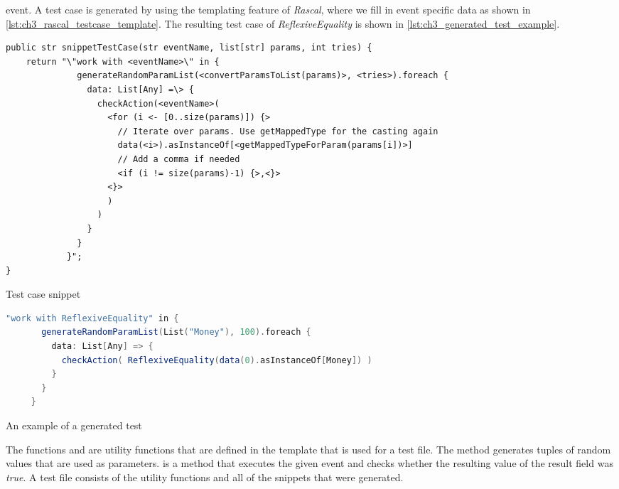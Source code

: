 event. A test case is generated by using the templating feature of
\textit{Rascal}, where we fill in event specific data as shown in
\autoref{lst:ch3_rascal_testcase_template}. The resulting test case of
\textit{ReflexiveEquality} is shown in \autoref{lst:ch3_generated_test_example}.
\begin{sourcecode}[!ht]
\begin{lstlisting}[language=Rascal]
public str snippetTestCase(str eventName, list[str] params, int tries) {
	return "\"work with <eventName>\" in {
	          generateRandomParamList(<convertParamsToList(params)>, <tries>).foreach {
	            data: List[Any] =\> {
	              checkAction(<eventName>(
	       	        <for (i <- [0..size(params)]) {>
                      // Iterate over params. Use getMappedType for the casting again
                      data(<i>).asInstanceOf[<getMappedTypeForParam(params[i])>]
                      // Add a comma if needed
                      <if (i != size(params)-1) {>,<}>
                    <}>
	                )
	              )
	            }
	          }
	        }";
}
\end{lstlisting}
\caption{Test case snippet}
\label{lst:ch3_rascal_testcase_template}
\end{sourcecode}
\FloatBarrier

\begin{sourcecode}[!ht]
\begin{lstlisting}[language=Scala]
    "work with ReflexiveEquality" in {
       generateRandomParamList(List("Money"), 100).foreach {
         data: List[Any] => {
           checkAction( ReflexiveEquality(data(0).asInstanceOf[Money]) )
         }
       }
     }
\end{lstlisting}
\caption{An example of a generated test}
\label{lst:ch3_generated_test_example}
\end{sourcecode}
\FloatBarrier
The functions  and  are utility
functions that are defined in the template that is used for a test file. The
 method generates tuples of random values that
are used as parameters.  is a method that executes the given
event and checks whether the resulting value of the result field was
\textit{true}. A test file consists of the utility functions and all of the
snippets that were generated.

